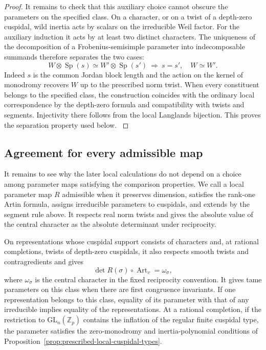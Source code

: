 \begin{proof}
It remains to check that this auxiliary choice cannot obscure the parameters on the specified class. On a character, or on a twist of a depth-zero cuspidal, wild inertia acts by scalars on the irreducible Weil factor. For the auxiliary induction it acts by at least two distinct characters. The uniqueness of the decomposition of a Frobenius-semisimple parameter into indecomposable summands therefore separates the two cases:
\[
 W\otimes\operatorname{Sp}(s)\simeq W'\otimes\operatorname{Sp}(s')
       \ \Longrightarrow\ s=s',\quad W\simeq W'.
\]
Indeed \(s\) is the common Jordan block length and the action on the kernel of monodromy recovers \(W\) up to the prescribed norm twist. When every constituent belongs to the specified class, the construction coincides with the ordinary local correspondence by the depth-zero formula and compatibility with twists and segments. Injectivity there follows from the local Langlands bijection. This proves the separation property used below. \cite{henniart-local,adrian-roe,zelevinsky}

\end{proof}

\subsection{Agreement for every admissible map}

It remains to see why the later local calculations do not depend on a choice among
parameter maps satisfying the comparison properties. We call a local parameter map \(R\) admissible when it preserves
dimension, satisfies the rank-one Artin formula, assigns
irreducible parameters to cuspidals, and extends by the segment
rule above. It respects real norm twists and gives the absolute
value of the central character as the absolute determinant
under reciprocity.

On representations whose cuspidal support consists of
characters and, at rational completions, twists of depth-zero
cuspidals, it also respects smooth twists and contragredients and gives
\[
        \det R(\sigma)\circ\operatorname{Art}_v
            =\omega_\sigma ,
\]
where \(\omega_\sigma\) is the central character in the fixed
reciprocity convention. It gives tame parameters on this class
when there are first congruence invariants. If one representation belongs to this class,
equality of its parameter with that of any irreducible
implies equality of the representations. At a rational completion, if the restriction to
\(\mathrm{GL}_n(\mathbb Z_p)\) contains the inflation of the
regular finite cuspidal type, the parameter satisfies the
zero-monodromy and inertia-polynomial conditions of Proposition~\ref{prop:prescribed-local-cuspidal-types}.


